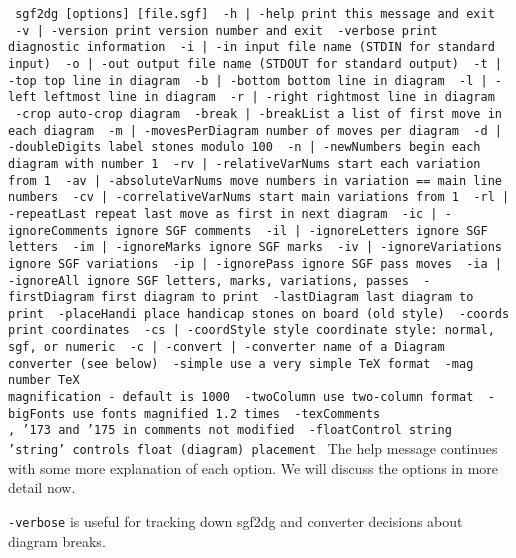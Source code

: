 \bigbreak
{\tt\parskip=0pt\parindent=5pt\obeylines\obeyspaces\hsize=400pt
\def\[{{\char'173}}
\def\]{{\char'175}}
sgf2dg [options] [file.sgf]
\medskip
\ -h | -help                 print this message and exit
\ -v | -version              print version number and exit
\ -verbose                   print diagnostic information
\ -i | -in                   input file name (STDIN for standard input)
\ -o | -out                  output file name (STDOUT for standard output)
\ -t | -top                  top line in diagram
\ -b | -bottom               bottom line in diagram
\ -l | -left                 leftmost line in diagram
\ -r | -right                rightmost line in diagram
\ -crop                      auto-crop diagram
\ -break | -breakList        a list of first move in each diagram
\ -m | -movesPerDiagram      number of moves per diagram
\ -d | -doubleDigits         label stones modulo 100
\ -n | -newNumbers           begin each diagram with number 1
\ -rv | -relativeVarNums     start each variation from 1
\ -av | -absoluteVarNums     move numbers in variation == main line numbers
\ -cv | -correlativeVarNums  start main variations from 1 
\ -rl | -repeatLast          repeat last move as first in next diagram
\ -ic | -ignoreComments      ignore SGF comments
\ -il | -ignoreLetters       ignore SGF letters
\ -im | -ignoreMarks         ignore SGF marks
\ -iv | -ignoreVariations    ignore SGF variations
\ -ip | -ignorePass          ignore SGF pass moves
\ -ia | -ignoreAll           ignore SGF letters, marks, variations, passes
\ -firstDiagram              first diagram to print
\ -lastDiagram               last diagram to print
\ -placeHandi                place handicap stones on board (old style)
\ -coords                    print coordinates
\ -cs | -coordStyle style    coordinate style: normal, sgf, or numeric
\ -c | -convert | -converter name of a Diagram converter (see below)
\ -simple                    use a very simple TeX format
\ -mag number                TeX \\magnification - default is 1000
\ -twoColumn                 use two-column format
\ -bigFonts                  use fonts magnified 1.2 times
\ -texComments               \\, \[ and \] in comments not modified
\ -floatControl string       'string' controls float (diagram) placement
}
\bigbreak
The help message continues with some more explanation of each option.
We will discuss the options in more detail now.

{\tt -verbose} is useful for tracking down sgf2dg and converter decisions
about diagram breaks.

